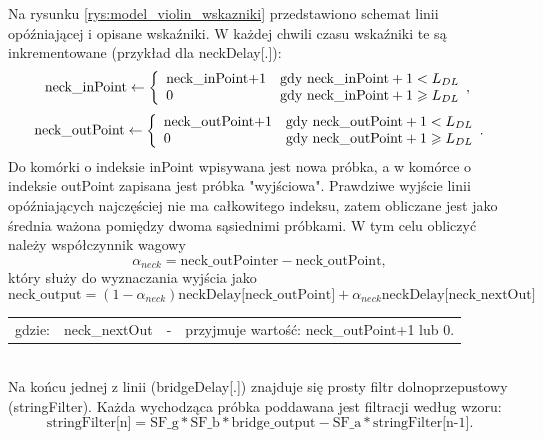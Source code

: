 Na rysunku \ref{rys:model_violin_wskazniki} przedstawiono schemat linii opóźniającej i opisane wskaźniki. W każdej chwili czasu wskaźniki te są inkrementowane (przykład dla neckDelay[.]):
\begin{equation} \label{equ:model_wskazniki}
\text{neck\_inPoint} \gets \left \{ 
\begin{array}{ l l}
\text{neck\_inPoint+1} &  \text{gdy neck\_inPoint}+1 < L_{DL} \\
0 &  \text{gdy neck\_inPoint}+1 \geqslant L_{DL}
\end{array},
\right.
\end{equation}
\begin{equation} \label{equ:model_wskazniki2}
\text{neck\_outPoint} \gets \left \{ 
\begin{array}{ l l}
\text{neck\_outPoint+1} &  \text{gdy neck\_outPoint}+1 < L_{DL} \\
0 &  \text{gdy neck\_outPoint}+1 \geqslant L_{DL}
\end{array}.
\right.
\end{equation}
 Do komórki o indeksie inPoint wpisywana jest nowa próbka, a w komórce o indeksie outPoint zapisana jest próbka "wyjściowa". Prawdziwe wyjście linii opóźniających najczęściej nie ma całkowitego indeksu, zatem obliczane jest jako średnia ważona pomiędzy dwoma sąsiednimi próbkami. W tym celu obliczyć należy współczynnik wagowy
 \begin{equation} \label{equ:model_alpha}
\alpha_{neck} = \text{neck\_outPointer} - \text{neck\_outPoint},
 \end{equation}
który służy do wyznaczania wyjścia jako
 \begin{equation} \label{equ:model_neckoutput}
\text{neck\_output} = (1 - \alpha_{neck}) \text{neckDelay[neck\_outPoint]} + \alpha_{neck} \text{neckDelay[neck\_nextOut]}
\end{equation}
\begin{tabular}{ l l l l}
	gdzie: & neck\_nextOut & - & przyjmuje wartość: neck\_outPoint+1 lub 0. \\
\end{tabular} \\
Na końcu jednej z linii (bridgeDelay[.]) znajduje się prosty filtr dolnoprzepustowy (stringFilter). Każda wychodząca próbka poddawana jest filtracji według wzoru:
 \begin{equation} \label{equ:model_stringfilter}
\text{stringFilter[n]} = \text{SF}\_\text{g}*\text{SF}\_\text{b}*\text{bridge\_output} - \text{SF}\_\text{a}* \text{stringFilter[n-1]}.
\end{equation}
